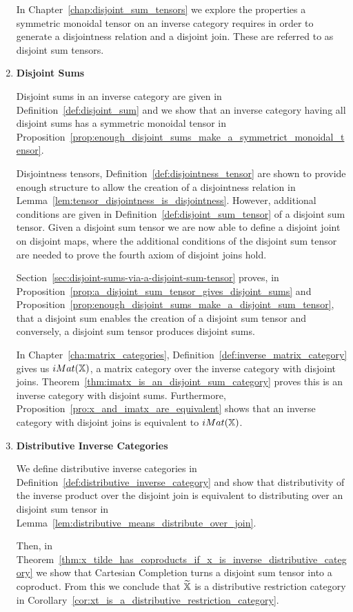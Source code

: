 \begin{enumerate}
In Chapter~\ref{chap:disjoint_sum_tensors} we explore the properties a symmetric monoidal tensor
on an inverse category requires in order to generate a disjointness relation and a disjoint
join. These are referred to as disjoint sum tensors.

\item \textbf{Disjoint Sums}

Disjoint sums in an inverse category are given in Definition~\ref{def:disjoint_sum} and we show that
an inverse category having all disjoint sums has a symmetric monoidal tensor in
Proposition~\ref{prop:enough_disjoint_sums_make_a_symmetrict_monoidal_tensor}.

Disjointness tensors, Definition~\ref{def:disjointness_tensor} are shown to provide enough structure
to allow the creation of a disjointness relation in
Lemma~\ref{lem:tensor_disjointness_is_disjointness}. However, additional conditions are given in
Definition~\ref{def:disjoint_sum_tensor} of a disjoint sum tensor. Given a disjoint sum tensor we
are now able to define a disjoint joint on disjoint maps, where the additional conditions of the
disjoint sum tensor are needed to prove the fourth axiom of disjoint joins hold.

Section~\ref{sec:disjoint-sums-via-a-disjoint-sum-tensor} proves, in
Proposition~\ref{prop:a_disjoint_sum_tensor_gives_disjoint_sums} and
Proposition~\ref{prop:enough_disjoint_sums_make_a_disjoint_sum_tensor}, that a disjoint sum enables
the creation of a disjoint sum tensor and conversely, a disjoint sum tensor produces disjoint sums.


In Chapter~\ref{cha:matrix_categories}, Definition~\ref{def:inverse_matrix_category} gives us
$iMat({\mathbb{X}})$, a matrix category over the inverse category \X with disjoint
joins. Theorem~\ref{thm:imatx_is_an_disjoint_sum_category} proves this is an inverse category with
disjoint sums. Furthermore, Proposition~\ref{pro:x_and_imatx_are_equivalent} shows
that an inverse category \X with disjoint joins is equivalent to $iMat({\mathbb{X}})$.


\item \textbf{Distributive Inverse Categories}

We define distributive inverse categories in Definition~\ref{def:distributive_inverse_category} and
show that distributivity of the inverse product over the disjoint join is equivalent to distributing
over an disjoint sum tensor in Lemma~\ref{lem:distributive_means_distribute_over_join}.

Then, in Theorem~\ref{thm:x_tilde_has_coproducts_if_x_is_inverse_distributive_category} we show that
Cartesian Completion turns a disjoint sum tensor into a coproduct. From this we conclude that $\widetilde{\mathbb{X}}$
is a distributive restriction category in
Corollary~\ref{cor:xt_is_a_distributive_restriction_category}.


\end{enumerate}
